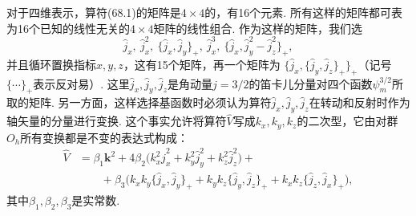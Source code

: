 对于四维表示，算符(68.1)的矩阵是$4\times4$的，有16个元素. 所有这样的矩阵都可表为16个已知的线性无关的$4\times4$矩阵的线性组合. 作为这样的矩阵，我们选
\begin{equation*}
\hat{j}_x,\ \hat{j}^2_x,\ \{\hat{j}_x,\hat{j}_y\}_+,\ \hat{j}^3_x,\
\{\hat{j}_x,\hat{j}^2_y-\hat{j}^2_z\}_+,
\end{equation*}
并且循环置换指标$x,y,z$，这有15个矩阵，再一个矩阵为
$\{\hat{j}_x,\{\hat{j}_y,\hat{j}_z\}_+\}_+$（记号$\{\cdots\}_+$表示反对易）. 这里$\hat{j}_x,\hat{j}_y,\hat{j}_z$是角动量$j=3/2$的笛卡儿分量对四个函数$\psi^{3/2}_m$所取的矩阵. 另一方面，这样选择基函数时必须认为算符$\hat{j}_x,\hat{j}_y,\hat{j}_z$在转动和反射时作为轴矢量的分量进行变换. 这个事实允许将算符$\hat{V}$写成$k_x,k_y,k_z$的二次型，它由对群$O_h$所有变换都是不变的表达式构成：
\begin{equation}
\begin{aligned}
\hat{V}&=\beta_1\bm{k}^2+4\beta_2\bigl(k^2_x\hat{j}^2_x+k^2_y\hat{j}^2_y+k^2_z\hat{j}^2_z\bigr)+{}\\
&\qquad+\beta_3\bigl(k_xk_y\{\hat{j}_x,\hat{j}_y\}_+
+k_yk_z\{\hat{j}_y,\hat{j}_z\}_+
+k_xk_z\{\hat{j}_z,\hat{j}_x\}_+\bigr),
\end{aligned}
\end{equation}
其中$\beta_1,\beta_2,\beta_3$是实常数.

